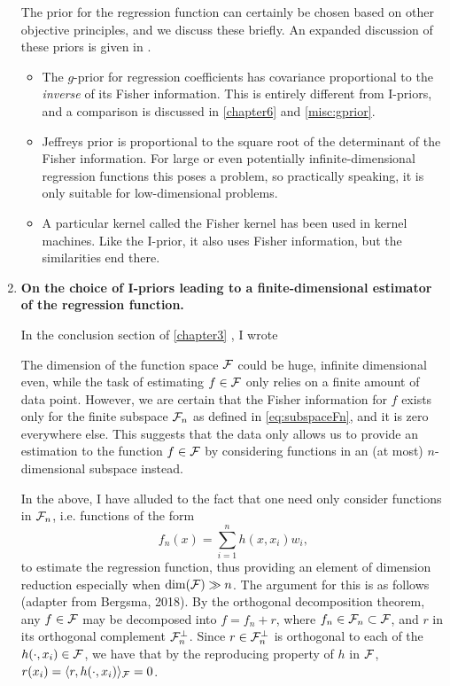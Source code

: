 \documentclass[11pt,showframe,twoside,openright]{report}
\begin{document}
\begin{enumerate}
  The prior for the regression function can certainly be chosen based on other objective principles, and we discuss these briefly.
  An expanded discussion of these priors is given in \citet{bergsma2017}.
  \begin{itemize}
    \item The $g$-prior \citep{zellner1986assessing} for regression coefficients has covariance proportional to the \emph{inverse} of its Fisher information. This is entirely different from I-priors, and a comparison is discussed in \cref{chapter6} and \cref{misc:gprior}.
    \item Jeffreys prior \citep{jeffreys1946invariant} is proportional to the square root of the determinant of the Fisher information. For large or even potentially infinite-dimensional regression functions this poses a problem, so practically speaking, it is only suitable for low-dimensional problems.
    \item A particular kernel called the Fisher kernel has been used in kernel machines. Like the I-prior, it also uses Fisher information, but the similarities end there. 
  \end{itemize}
  
  \item \textbf{On the choice of I-priors leading to a finite-dimensional estimator of the regression function.}
  
  In the conclusion section of \cref{chapter3} , I wrote
  
  \begin{displayquote}
The dimension of the function space ${\mathcal F}$ could be huge, infinite dimensional even, while the task of estimating $f\in{\mathcal F}$ only relies on a finite amount of data point.
However, we are certain that the Fisher information for $f$ exists only for the finite subspace ${\mathcal F}_n$ as defined in \cref{eq:subspaceFn}, and it is zero everywhere else.
This suggests that the data only allows us to provide an estimation to the function $f\in{\mathcal F}$ by considering functions in an (at most) $n$-dimensional subspace instead.
\end{displayquote}
  
  In the above, I have alluded to the fact that one need only consider functions in ${\mathcal F}_n$, i.e. functions of the form
  \begin{equation}
    f_n(x) = \sum_{i=1}^n h(x,x_i)w_i,
  \end{equation}
  to estimate the regression function, thus providing an element of dimension reduction especially when $\dim({\mathcal F}) \gg n$.
  The argument for this is as follows (adapter from Bergsma, 2018).
  By the orthogonal decomposition theorem, any $f\in{\mathcal F}$ may be decomposed into $f = f_n + r$, where $f_n\in{\mathcal F}_n\subset {\mathcal F}$, and $r$ in its orthogonal complement ${\mathcal F}_n^\bot$.
  Since $r\in{\mathcal F}_n^\bot$ is orthogonal to each of the $h(\cdot,x_i)\in{\mathcal F}$, we have that by the reproducing property of $h$ in ${\mathcal F}$, $r(x_i)=\langle r, h(\cdot,x_i)\rangle_{\mathcal F}=0$.
  

\end{enumerate}
\end{document}

